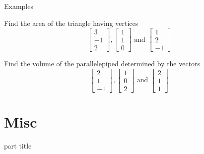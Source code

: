 \documentclass{beamer}
\begin{document}
\begin{frame}{Examples}
\begin{example}
Find the area of the triangle having vertices
\begin{equation*}
\left[
\begin{array}{c}
3\\
-1\\
2
\end{array}
\right], \left[
\begin{array}{c}
1\\
1\\
0
\end{array}
\right]\text{ and } \left[
\begin{array}{c}
1\\
2\\
-1
\end{array}
\right]
\end{equation*}
\end{example}
\begin{example}
Find the volume of the parallelepiped determined by the vectors
\begin{equation*}
\left[
\begin{array}{c}
2\\
1\\
-1
\end{array}
\right], \left[
\begin{array}{c}
1\\
0\\
2
\end{array}
\right]\text{ and } \left[
\begin{array}{c}
2\\
1\\
1
\end{array}
\right]
\end{equation*}
\end{example}
\end{frame}

\section{Misc}

\begin{frame}
\begin{beamercolorbox}[sep=12pt,center]{part title}
\insertsection\par
\end{beamercolorbox}
\end{frame}
\end{document}
